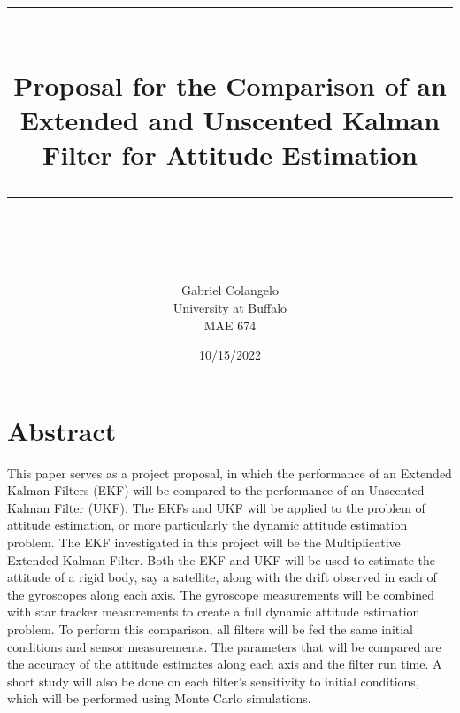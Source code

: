 \documentclass[12pt]{report}
\newcommand{\HRule}[1]{\rule{\linewidth}{#1}}
\begin{document}
\title{ \normalsize \textsc{ }
		\\ [2.0cm]
		\HRule{0.5pt} \\
		\LARGE \textbf{Proposal for the Comparison of an Extended and Unscented Kalman Filter for Attitude Estimation}
		\HRule{2pt} \\ [0.5cm]
		\normalsize  \vspace*{5\baselineskip}}



\author{Gabriel Colangelo \\ 
		University at Buffalo \\
		MAE 674} 
\date {10/15/2022}

\maketitle
\tableofcontents
\newpage

\sectionfont{\scshape}

\newpage
\section*{Abstract}
\noindent This paper serves as a project proposal, in which the performance of an Extended Kalman Filters (EKF) will be compared to the performance of an Unscented Kalman Filter (UKF). The EKFs and UKF will be applied to the problem of attitude estimation, or more particularly the dynamic attitude estimation problem. The EKF investigated in this project will be the Multiplicative Extended Kalman Filter. Both the EKF and UKF will be used to estimate the attitude of a rigid body, say a satellite, along with the drift observed in each of the gyroscopes along each axis. The gyroscope measurements will be combined with star tracker measurements to create a full dynamic attitude estimation problem. To perform this comparison, all filters will be fed the same initial conditions and sensor measurements. The parameters that will be compared are the accuracy of the attitude estimates along each axis and the filter run time. A short study will also be done on each filter’s sensitivity to initial conditions, which will be performed using Monte Carlo simulations.
\end{document}
